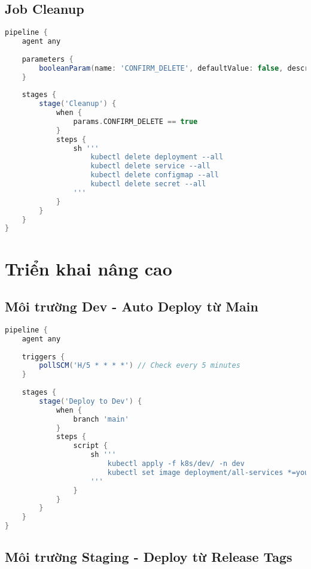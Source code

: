\documentclass[12pt,a4paper]{article}
\begin{document}
\subsection{Job Cleanup}

\begin{lstlisting}[language=groovy, caption=Job cleanup để xóa deployment]
pipeline {
    agent any
    
    parameters {
        booleanParam(name: 'CONFIRM_DELETE', defaultValue: false, description: 'Confirm deletion of developer environment')
    }
    
    stages {
        stage('Cleanup') {
            when {
                params.CONFIRM_DELETE == true
            }
            steps {
                sh '''
                    kubectl delete deployment --all
                    kubectl delete service --all
                    kubectl delete configmap --all
                    kubectl delete secret --all
                '''
            }
        }
    }
}
\end{lstlisting}

\section{Triển khai nâng cao}

\subsection{Môi trường Dev - Auto Deploy từ Main}

\begin{lstlisting}[language=groovy, caption=Pipeline auto deploy dev environment]
pipeline {
    agent any
    
    triggers {
        pollSCM('H/5 * * * *') // Check every 5 minutes
    }
    
    stages {
        stage('Deploy to Dev') {
            when {
                branch 'main'
            }
            steps {
                script {
                    sh '''
                        kubectl apply -f k8s/dev/ -n dev
                        kubectl set image deployment/all-services *=your-dockerhub/*:latest -n dev
                    '''
                }
            }
        }
    }
}
\end{lstlisting}

\subsection{Môi trường Staging - Deploy từ Release Tags}
\end{document}
